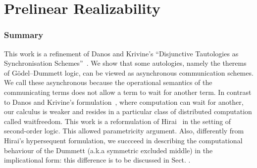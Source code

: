 \chapter{Prelinear Realizability}




% 


\renewcommand{\vec}{\overrightarrow}
\newcommand{\sche}{\sqsubseteq}


\newcommand{\sequent}[2]{{#1}\tr{#2}}
\newcommand{\aseq}[2]{\AxiomC{$\sequent{#1}{#2}$}}
\newcommand{\useq}[2]{\UnaryInfC{$\sequent{#1}{#2}$}}
\newcommand{\bseq}[2]{\BinaryInfC{$\sequent{#1}{#2}$}}
\newcommand{\tseq}[2]{\TrinaryInfC{$\sequent{#1}{#2}$}}

\newcommand{\limp}{\multimap}


\subsection{Summary}
This work is a refinement of
Danos and Krivine's ``Disjunctive Tautologies as
Synchronisation Schemes''~\cite{danos-krivine}.
We show that some autologies,
namely the therems of G\"odel--Dummett logic,
can be viewed as asynchronous communication schemes.
We call these asynchronous because the operational semantics
of the communicating terms does not allow a term to wait for another
term.
In contrast to Danos and Krivine's formulation~\cite{danos-krivine},
where computation can wait for another,
our calculus is weaker and resides in a particular class of
distributed computation called waitfreedom.
This work is a reformulation of Hirai~\cite{hiraiflops2012} in the setting of
second-order logic.
This allowed parametricity argument.
Also, differently from Hirai's  hypersequent formulation,
we succceed in describing the computational behaviour of the Dummett
(a.k.a symmetric excluded middle) in the implicational form: this
difference is to be discussed in Sect. .

